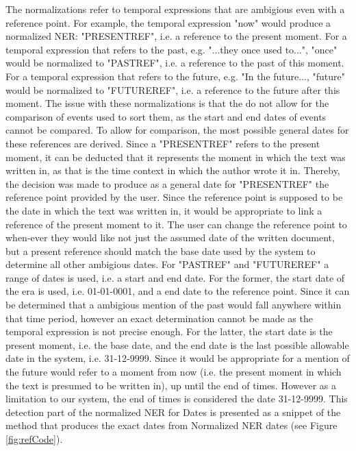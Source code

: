 \par The normalizations refer to temporal expressions that are ambigious even with a reference point. For example, the temporal expression "now" would produce a normalized NER: "PRESENT\textunderscore REF", i.e. a reference to the present moment. For a temporal expression that refers to the past, e.g. "...they once used to...", "once" would be normalized to "PAST\textunderscore REF", i.e. a reference to the past of this moment. For a temporal expression that refers to the future, e.g. "In the future..., "future" would be normalized to "FUTURE\textunderscore REF", i.e. a reference to the future after this moment. The issue with these normalizations is that the do not allow for the comparison of events used to sort them, as the start and end dates of events cannot be compared. To allow for comparison, the most possible general dates for these references are derived. Since a "PRESENT\textunderscore REF" refers to the present moment, it can be deducted that it represents the moment in which the text was written in, as that is the time context in which the author wrote it in. Thereby, the decision was made to produce as a general date for "PRESENT\textunderscore REF" the reference point provided by the user. Since the reference point is supposed to be the date in which the text was written in, it would be appropriate to link a reference of the present moment to it. The user can change the reference point to when-ever they would like not just the assumed date of the written document, but a present reference should match the base date used by the system to determine all other ambigious dates. For "PAST\textunderscore REF" and "FUTURE\textunderscore REF" a range of dates is used, i.e. a start and end date. For the former, the start date of the era is used, i.e. 01-01-0001, and a end date to the reference point. Since it can be determined that a ambigious mention of the past would fall anywhere within that time period, however an exact determination cannot be made as the temporal expression is not precise enough. For the latter, the start date is the present moment, i.e. the base date, and the end date is the last possible allowable date in the system, i.e. 31-12-9999. Since it would be appropriate for a mention of the future would refer to a moment from now (i.e. the present moment in which the text is presumed to be written in), up until the end of times. However as a limitation to our system, the end of times is considered the date 31-12-9999. This detection part of the normalized NER for Dates is presented as a snippet of the method that produces the exact dates from Normalized NER dates (see Figure \ref{fig:refCode}).

